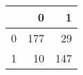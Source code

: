 \begin{tabular}{lrr}
\toprule
{} &    0 &    1 \\
\midrule
0 &  177 &   29 \\
1 &   10 &  147 \\
\bottomrule
\end{tabular}
